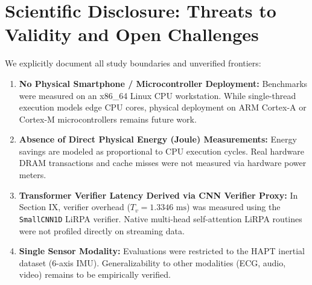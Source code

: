 \documentclass[journal,onecolumn,10pt]{IEEEtran}
\newcommand{\code}[1]{{\small\ttfamily\nolinkurl{#1}}}
\theoremstyle{remark}
\begin{document}
\section{Scientific Disclosure: Threats to Validity and Open Challenges}
We explicitly document all study boundaries and unverified frontiers:
\begin{enumerate}[leftmargin=1.4em]
  \item \textbf{No Physical Smartphone / Microcontroller Deployment:} Benchmarks were measured on an x86\_64 Linux CPU workstation. While single-thread execution models edge CPU cores, physical deployment on ARM Cortex-A or Cortex-M microcontrollers remains future work.
  \item \textbf{Absence of Direct Physical Energy (Joule) Measurements:} Energy savings are modeled as proportional to CPU execution cycles. Real hardware DRAM transactions and cache misses were not measured via hardware power meters.
  \item \textbf{Transformer Verifier Latency Derived via CNN Verifier Proxy:} In Section IX, verifier overhead ($T_v = 1.3346\text{ ms}$) was measured using the \code{SmallCNN1D} LiRPA verifier. Native multi-head self-attention LiRPA routines were not profiled directly on streaming data.
  \item \textbf{Single Sensor Modality:} Evaluations were restricted to the HAPT inertial dataset (6-axis IMU). Generalizability to other modalities (ECG, audio, video) remains to be empirically verified.
\end{enumerate}

\end{document}
